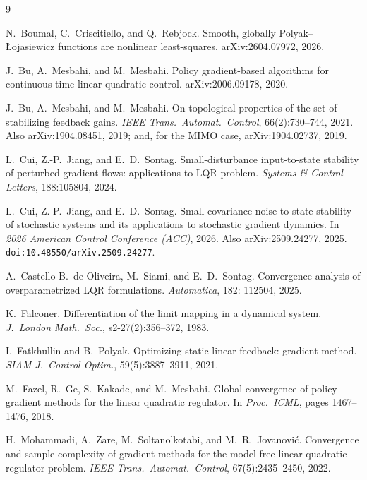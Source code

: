 \documentclass[11pt]{article}
\theoremstyle{plain}
\theoremstyle{definition}
\theoremstyle{remark}
\begin{document}
\begin{thebibliography}{9}

N.~Boumal, C.~Criscitiello, and Q.~Rebjock.
\newblock Smooth, globally Polyak--\L{}ojasiewicz functions are nonlinear
least-squares.
\newblock arXiv:2604.07972, 2026.

J.~Bu, A.~Mesbahi, and M.~Mesbahi.
\newblock Policy gradient-based algorithms for continuous-time linear quadratic
control.
\newblock arXiv:2006.09178, 2020.

J.~Bu, A.~Mesbahi, and M.~Mesbahi.
\newblock On topological properties of the set of stabilizing feedback gains.
\newblock \emph{IEEE Trans.\ Automat.\ Control}, 66(2):730--744, 2021.
Also arXiv:1904.08451, 2019; and, for the MIMO case, arXiv:1904.02737, 2019.

L.~Cui, Z.-P.~Jiang, and E.~D.~Sontag.
\newblock Small-disturbance input-to-state stability of perturbed gradient
flows: applications to LQR problem.
\newblock \emph{Systems \& Control Letters}, 188:105804, 2024.

L.~Cui, Z.-P.~Jiang, and E.~D.~Sontag.
\newblock Small-covariance noise-to-state stability of stochastic systems and its
applications to stochastic gradient dynamics.
\newblock In \emph{2026 American Control Conference (ACC)}, 2026.
Also arXiv:2509.24277, 2025. \texttt{doi:10.48550/arXiv.2509.24277}.

A.~Castello B.~de Oliveira, M.~Siami, and E.~D.~Sontag.
\newblock Convergence analysis of overparametrized LQR formulations.
\newblock \emph{Automatica}, 182: 112504, 2025.

K.~Falconer.
\newblock Differentiation of the limit mapping in a dynamical system.
\newblock \emph{J.\ London Math.\ Soc.}, s2-27(2):356--372, 1983.

I.~Fatkhullin and B.~Polyak.
\newblock Optimizing static linear feedback: gradient method.
\newblock \emph{SIAM J.\ Control Optim.}, 59(5):3887--3911, 2021.

M.~Fazel, R.~Ge, S.~Kakade, and M.~Mesbahi.
\newblock Global convergence of policy gradient methods for the linear quadratic
regulator.
\newblock In \emph{Proc.\ ICML}, pages 1467--1476, 2018.

H.~Mohammadi, A.~Zare, M.~Soltanolkotabi, and M.~R.~Jovanovi\'c.
\newblock Convergence and sample complexity of gradient methods for the
model-free linear-quadratic regulator problem.
\newblock \emph{IEEE Trans.\ Automat.\ Control}, 67(5):2435--2450, 2022.


\end{thebibliography}
\end{document}
